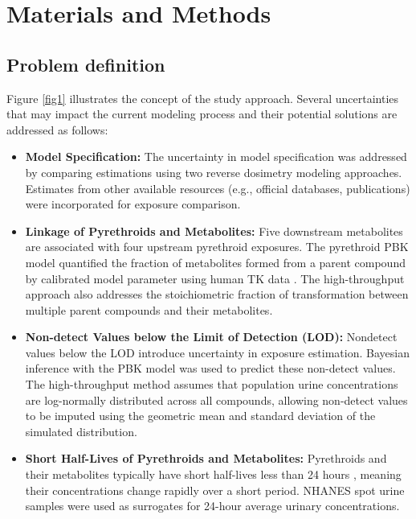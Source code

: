 \documentclass[toxics,article,submit,pdftex,moreauthors]{Definitions/mdpi}
\begin{document}

\section{Materials and Methods}\label{materials-and-methods}

\subsection{Problem definition}\label{problem-definition}

Figure \ref{fig1} illustrates the concept of the study approach. Several
uncertainties that may impact the current modeling process and their potential solutions
are addressed as follows:

\begin{itemize}
\item
  \textbf{Model Specification:} The uncertainty in model specification
  was addressed by comparing estimations using two reverse dosimetry
  modeling approaches. Estimates from other available resources (e.g.,
  official databases, publications) were incorporated for exposure
  comparison.
\item
  \textbf{Linkage of Pyrethroids and Metabolites:} Five downstream
  metabolites are associated with four upstream pyrethroid exposures.
  The pyrethroid PBK model quantified the fraction of metabolites formed
  from a parent compound by calibrated model parameter using human TK
  data \citep{quindroit2019estimating}. The high-throughput approach
  also addresses the stoichiometric fraction of transformation between
  multiple parent compounds and their metabolites.
\item
  \textbf{Non-detect Values below the Limit of Detection (LOD):}
  Nondetect values below the LOD introduce uncertainty in exposure
  estimation. Bayesian inference with the PBK model was used to predict
  these non-detect values. The high-throughput method assumes that
  population urine concentrations are log-normally distributed across
  all compounds, allowing non-detect values to be imputed using the
  geometric mean and standard deviation of the simulated distribution.
\item
  \textbf{Short Half-Lives of Pyrethroids and Metabolites:} Pyrethroids
  and their metabolites typically have short half-lives less than 24
  hours \citep{hays2007biomonitoring}, meaning their concentrations
  change rapidly over a short period. NHANES spot urine
  samples were used as surrogates for 24-hour average urinary concentrations. 

\end{itemize}
\end{document}
